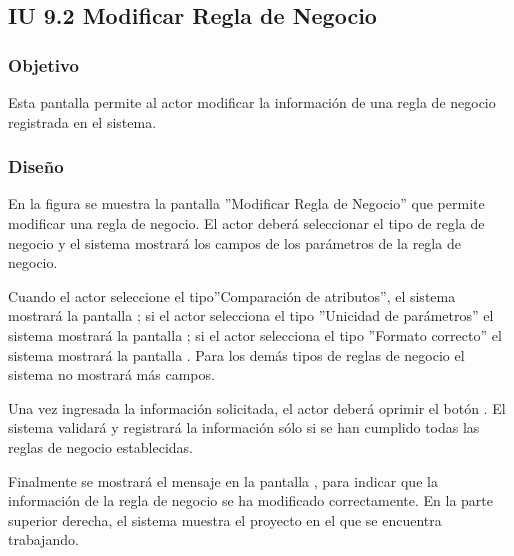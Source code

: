 \subsection{IU 9.2 Modificar Regla de Negocio}

\subsubsection{Objetivo}
	Esta pantalla permite al actor modificar la información de una regla de negocio registrada en el sistema.
\subsubsection{Diseño}
	En la figura  se muestra la pantalla ''Modificar Regla de Negocio'' que permite modificar una regla de negocio. El actor deberá seleccionar el tipo de regla de negocio y el sistema mostrará los campos de los parámetros de la regla de negocio.
	
	Cuando el actor seleccione el tipo''Comparación de atributos'', el sistema mostrará la pantalla ; si el actor selecciona el tipo ''Unicidad de parámetros'' el sistema mostrará la pantalla ; si el actor selecciona el tipo ''Formato correcto'' el sistema mostrará la pantalla . Para los demás tipos de reglas de negocio el sistema no mostrará más campos.
	
	Una vez ingresada la información solicitada, el actor deberá oprimir el botón . El sistema validará y registrará la información sólo si se han cumplido todas las reglas de negocio establecidas.
	
	Finalmente se mostrará el mensaje  en la pantalla , para indicar que la información de la regla de negocio se ha modificado correctamente.
	En la parte superior derecha, el sistema muestra el proyecto en el que se encuentra trabajando.

